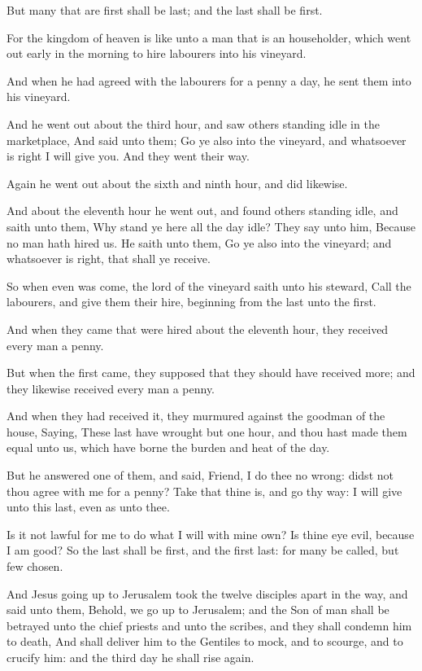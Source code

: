 \Verse But many that are first shall be last; and the last shall be first.


\Chapter
\Verse For the kingdom of heaven is like unto a man that is an householder, which went out early in the morning to hire labourers into his vineyard.

\Verse And when he had agreed with the labourers for a penny a day, he sent them into his vineyard.

\Verse And he went out about the third hour, and saw others standing idle in the marketplace, \Verse And said unto them; Go ye also into the vineyard, and whatsoever is right I will give you. And they went their way.

\Verse Again he went out about the sixth and ninth hour, and did likewise.

\Verse And about the eleventh hour he went out, and found others standing idle, and saith unto them, Why stand ye here all the day idle?  \Verse They say unto him, Because no man hath hired us. He saith unto them, Go ye also into the vineyard; and whatsoever is right, that shall ye receive.

\Verse So when even was come, the lord of the vineyard saith unto his steward, Call the labourers, and give them their hire, beginning from the last unto the first.

\Verse And when they came that were hired about the eleventh hour, they received every man a penny.

\Verse But when the first came, they supposed that they should have received more; and they likewise received every man a penny.

\Verse And when they had received it, they murmured against the goodman of the house, \Verse Saying, These last have wrought but one hour, and thou hast made them equal unto us, which have borne the burden and heat of the day.

\Verse But he answered one of them, and said, Friend, I do thee no wrong: didst not thou agree with me for a penny?  \Verse Take that thine is, and go thy way: I will give unto this last, even as unto thee.

\Verse Is it not lawful for me to do what I will with mine own? Is thine eye evil, because I am good?  \Verse So the last shall be first, and the first last: for many be called, but few chosen.

\Verse And Jesus going up to Jerusalem took the twelve disciples apart in the way, and said unto them, \Verse Behold, we go up to Jerusalem; and the Son of man shall be betrayed unto the chief priests and unto the scribes, and they shall condemn him to death, \Verse And shall deliver him to the Gentiles to mock, and to scourge, and to crucify him: and the third day he shall rise again.

